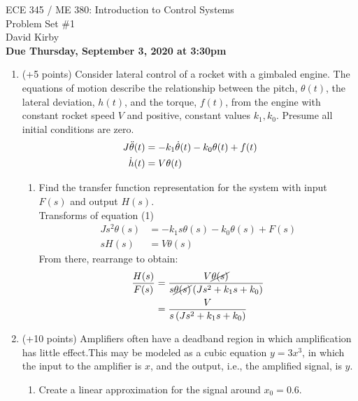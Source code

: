 \documentclass[11pt]{article}
\begin{document}
 	\begin{center}
 	\LARGE{ECE 345 / ME 380: Introduction to Control Systems\\Problem Set \#1}\\[1.5em]
 	\large David Kirby\\[1.5em]
 	\large \textbf{Due Thursday, September 3, 2020 at 3:30pm}\\[2.5em]
 	\end{center}

\begin{enumerate}
    \item (+5 points) Consider lateral control of a rocket with a gimbaled engine. The equations of motion describe the relationship between the pitch, \(\theta(t)\), the lateral deviation, \(h(t)\), and the torque, \(f(t)\), from the engine with constant rocket speed \(V\) and positive, constant values \(k_1,k_0\). Presume all initial conditions are zero.
    \begin{align}
        J\ddot{\theta}(t)&=-k_{1}\dot{\theta}(t)-k_{0}\theta(t)+f(t)\\
        \dot{h}(t)&=V\theta(t)\notag
    \end{align}
    \begin{enumerate}
        \item Find the transfer function representation for the system with input \(F(s)\) and output \(H(s)\).\\[1em]
        Transforms of equation (1)
        \begin{align*}
            Js^{2}\theta(s)&=-k_{1}s\theta(s)-k_{0}\theta(s)+F(s)\\
            sH(s)&=V\theta(s)
        \end{align*}
        From there, rearrange to obtain:
        \begin{align*}
            \frac{H(s)}{F(s)}&=\frac{V\cancel{\theta(s)}}{s\cancel{\theta(s)}\left(Js^{2}+k_{1}s+k_{0}\right)}\\
            &=\frac{V}{s\left(Js^{2}+k_{1}s+k_{0}\right)}
        \end{align*}
    \end{enumerate}
    \item (+10 points) Amplifiers often have a deadband region in which amplification has little effect.This may be modeled as a cubic equation \(y= 3x^3\), in which the input to the amplifier is \(x\), and the output, i.e., the amplified signal, is \(y\).
    \begin{enumerate}
        \item Create a linear approximation for the signal around \({x_0= 0.6}\).

\end{enumerate}
\end{enumerate}
\end{document}
